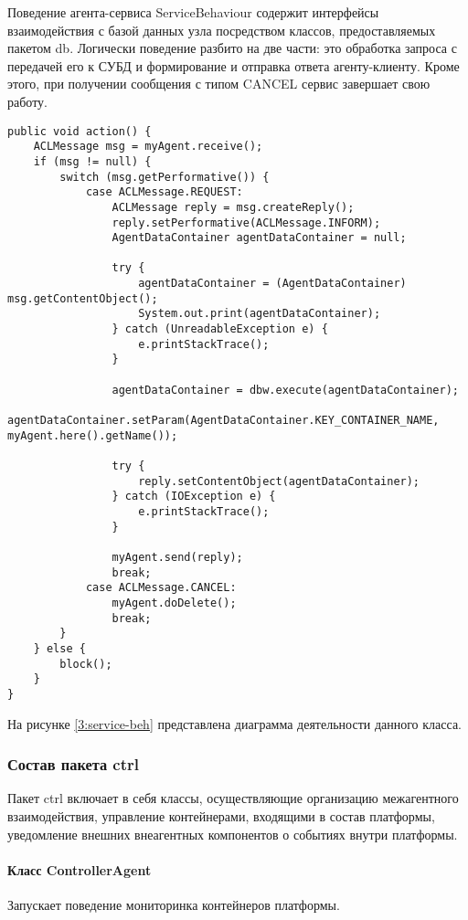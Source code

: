 Поведение агента-сервиса ServiceBehaviour содержит интерфейсы взаимодействия с базой данных узла посредством классов, предоставляемых пакетом db. Логически поведение разбито на две части: это обработка запроса с передачей его к СУБД и формирование и отправка ответа агенту-клиенту. Кроме этого, при получении сообщения с типом CANCEL сервис завершает свою работу.
\begin{lstlisting}
public void action() {
    ACLMessage msg = myAgent.receive();
    if (msg != null) {
        switch (msg.getPerformative()) {
            case ACLMessage.REQUEST:
                ACLMessage reply = msg.createReply();
                reply.setPerformative(ACLMessage.INFORM);
                AgentDataContainer agentDataContainer = null;

                try {
                    agentDataContainer = (AgentDataContainer) msg.getContentObject();
                    System.out.print(agentDataContainer);
                } catch (UnreadableException e) {
                    e.printStackTrace();
                }

                agentDataContainer = dbw.execute(agentDataContainer);
                agentDataContainer.setParam(AgentDataContainer.KEY_CONTAINER_NAME, myAgent.here().getName());

                try {
                    reply.setContentObject(agentDataContainer);
                } catch (IOException e) {
                    e.printStackTrace();
                }

                myAgent.send(reply);
                break;
            case ACLMessage.CANCEL:
                myAgent.doDelete();
                break;
        }
    } else {
        block();
    }
}
\end{lstlisting}
На рисунке \ref{3:service-beh} представлена диаграмма деятельности данного класса.

\subsubsection{Состав пакета ctrl}
Пакет ctrl включает в себя классы, осуществляющие организацию межагентного взаимодействия, управление контейнерами, входящими в состав платформы, уведомление внешних внеагентных компонентов о событиях внутри платформы.
\paragraph{Класс ControllerAgent}
Запускает поведение мониторинка контейнеров платформы.

